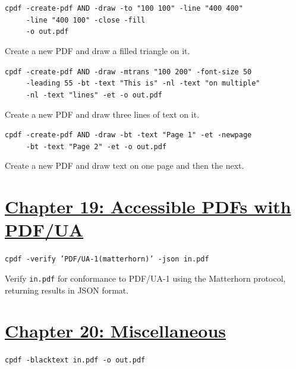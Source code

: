 \documentclass{book}
\begin{document}
\begin{framed}
 \noindent\small\verb?cpdf -create-pdf AND -draw -to "100 100" -line "400 400"?\\
 \noindent\small\verb?     -line "400 100" -close -fill?\\
 \noindent\small\verb?     -o out.pdf?
\end{framed}

\noindent Create a new PDF and draw a filled triangle on it.

\begin{framed}
 \noindent\small\verb?cpdf -create-pdf AND -draw -mtrans "100 200" -font-size 50?\\
 \noindent\small\verb?     -leading 55 -bt -text "This is" -nl -text "on multiple"?\\
 \noindent\small\verb?     -nl -text "lines" -et -o out.pdf?
\end{framed}

\noindent Create a new PDF and draw three lines of text on it.

\begin{framed}
 \noindent\small\verb!cpdf -create-pdf AND -draw -bt -text "Page 1" -et -newpage!\\
 \noindent\small\verb!     -bt -text "Page 2" -et -o out.pdf!
\end{framed}

\noindent Create a new PDF and draw text on one page and then the next.

\section*{\hyperref[chap:misc]{Chapter 19: Accessible PDFs with PDF/UA}}

\begin{framed}\noindent\texttt{cpdf -verify 'PDF/UA-1(matterhorn)' -json in.pdf}\end{framed}

\noindent Verify \texttt{in.pdf} for conformance to PDF/UA-1 using the Matterhorn protocol, returning results in JSON format.

\section*{\hyperref[chap:misc]{Chapter 20: Miscellaneous}}

\begin{framed}\noindent\texttt{cpdf -blacktext in.pdf -o out.pdf}\end{framed}
\end{document}

